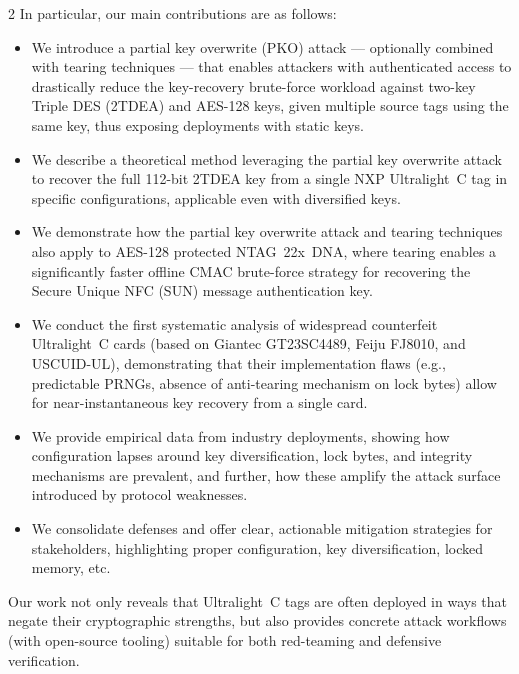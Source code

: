 \documentclass[10pt,letterpaper]{article}
\begin{document}
\begin{multicols}{2}
In particular, our main contributions are as follows:
\begin{itemize}
  \item We introduce a partial key overwrite (PKO) attack --- optionally combined with tearing techniques --- that enables attackers with authenticated access to drastically reduce the key-recovery brute-force workload against two-key Triple DES (2TDEA) and AES-128 keys, given multiple source tags using the same key, thus exposing deployments with static keys.
  \item We describe a theoretical method leveraging the partial key overwrite attack to recover the full 112-bit 2TDEA key from a single NXP Ultralight~C tag in specific configurations, applicable even with diversified keys.
  \item We demonstrate how the partial key overwrite attack and tearing techniques also apply to AES-128 protected NTAG~22x~DNA, where tearing enables a significantly faster offline CMAC brute-force strategy for recovering the Secure Unique NFC (SUN) message authentication key.
  \item We conduct the first systematic analysis of widespread counterfeit Ultralight~C cards (based on Giantec GT23SC4489, Feiju FJ8010, and USCUID-UL), demonstrating that their implementation flaws (e.g., predictable PRNGs, absence of anti-tearing mechanism on lock bytes) allow for near-instantaneous key recovery from a single card.
  \item We provide empirical data from industry deployments, showing how configuration lapses around key diversification, lock bytes, and integrity mechanisms are prevalent, and further, how these amplify the attack surface introduced by protocol weaknesses.
  \item We consolidate defenses and offer clear, actionable mitigation strategies for stakeholders, highlighting proper configuration, key diversification, locked memory, etc.
\end{itemize}

Our work not only reveals that Ultralight~C tags are often deployed in ways that negate their cryptographic strengths, but also provides concrete attack workflows (with open-source tooling) suitable for both red-teaming and defensive verification.


\end{multicols}
\end{document}
